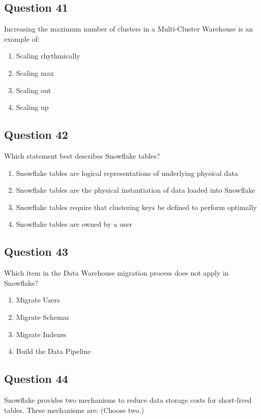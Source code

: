\documentclass[12pt]{article}
\begin{document}
\subsection*{Question 41}
Increasing the maximum number of clusters in a Multi-Cluster Warehouse is an example of:

\begin{enumerate}[label=\Alph*.]
  \item Scaling rhythmically
  \item Scaling max
  \item Scaling out
  \item Scaling up
\end{enumerate}

\subsection*{Question 42}
Which statement best describes Snowflake tables?

\begin{enumerate}[label=\Alph*.]
  \item Snowflake tables are logical representations of underlying physical data
  \item Snowflake tables are the physical instantiation of data loaded into Snowflake
  \item Snowflake tables require that clustering keys be defined to perform optimally
  \item Snowflake tables are owned by a user
\end{enumerate}

\subsection*{Question 43}
Which item in the Data Warehouse migration process does not apply in Snowflake?

\begin{enumerate}[label=\Alph*.]
  \item Migrate Users
  \item Migrate Schemas
  \item Migrate Indexes
  \item Build the Data Pipeline
\end{enumerate}

\subsection*{Question 44}
Snowflake provides two mechanisms to reduce data storage costs for short-lived tables. These mechanisms are: (Choose two.)
\end{document}
